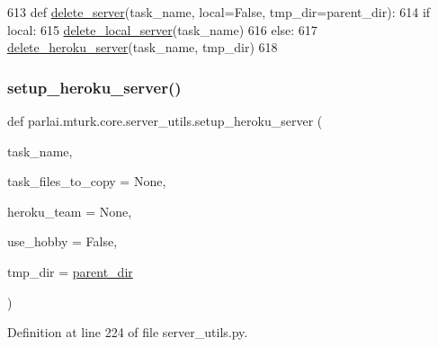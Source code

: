 \begin{DoxyCode}
613 \textcolor{keyword}{def }\hyperlink{namespaceparlai_1_1mturk_1_1core_1_1server__utils_a3c7c1d82bd4d26eb98ce9711de3cca7c}{delete\_server}(task\_name, local=False, tmp\_dir=parent\_dir):
614     \textcolor{keywordflow}{if} local:
615         \hyperlink{namespaceparlai_1_1mturk_1_1core_1_1server__utils_a9b4f4c3f696be001c2fa96b3690af83c}{delete\_local\_server}(task\_name)
616     \textcolor{keywordflow}{else}:
617         \hyperlink{namespaceparlai_1_1mturk_1_1core_1_1server__utils_a8dfde882f9d6ff492ca565ae2334fc70}{delete\_heroku\_server}(task\_name, tmp\_dir)
618 \end{DoxyCode}
\mbox{\label{namespaceparlai_1_1mturk_1_1core_1_1server__utils_af1c97e9b93a403e200ac75b87a51c3c1}} 
\subsubsection{\texorpdfstring{setup\+\_\+heroku\+\_\+server()}{setup\_heroku\_server()}}
{\footnotesize\ttfamily def parlai.\+mturk.\+core.\+server\+\_\+utils.\+setup\+\_\+heroku\+\_\+server (\begin{DoxyParamCaption}\item[{}]{task\+\_\+name,  }\item[{}]{task\+\_\+files\+\_\+to\+\_\+copy = {\ttfamily None},  }\item[{}]{heroku\+\_\+team = {\ttfamily None},  }\item[{}]{use\+\_\+hobby = {\ttfamily False},  }\item[{}]{tmp\+\_\+dir = {\ttfamily \hyperlink{namespaceparlai_1_1mturk_1_1core_1_1server__utils_a193439bdbc25a32b00f1a43e6f8532d8}{parent\+\_\+dir}} }\end{DoxyParamCaption})}



Definition at line 224 of file server\+\_\+utils.\+py.



